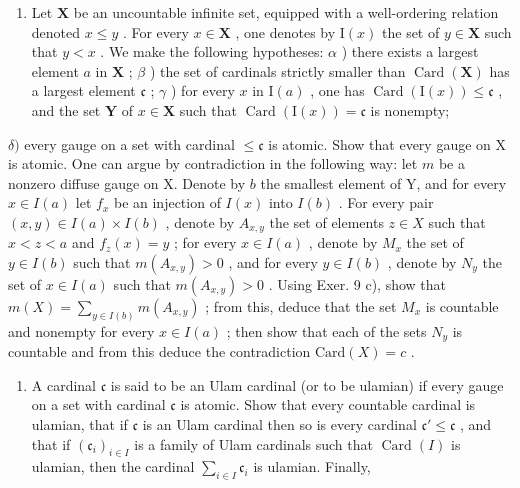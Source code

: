 \begin{enumerate}
\def\labelenumi{\arabic{enumi})}
\setcounter{enumi}{9}
\tightlist
\item
  Let \(\mathbf{X}\) be an uncountable infinite set, equipped with a well-ordering relation denoted \(x \leqslant y\) . For every \(x \in \mathbf{X}\) , one denotes by \(\mathrm{I}(x)\) the set of \(y \in \mathbf{X}\) such that \(y < x\) . We make the following hypotheses: \(\alpha\) ) there exists a largest element \(a\) in \(\mathbf{X}\) ; \(\beta\) ) the set of cardinals strictly smaller than \(\operatorname{Card}(\mathbf{X})\) has a largest element \(\mathfrak{c}\) ; \(\gamma\) ) for every \(x\) in \(\mathrm{I}(a)\) , one has \(\operatorname{Card}(\mathrm{I}(x)) \leqslant \mathfrak{c}\) , and the set \(\mathbf{Y}\) of \(x \in \mathbf{X}\) such that \(\operatorname{Card}(\mathrm{I}(x)) = \mathfrak{c}\) is nonempty;
\end{enumerate}

\(\delta)\) every gauge on a set with cardinal \(\leqslant \mathfrak{c}\) is atomic. Show that every gauge on X is atomic. One can argue by contradiction in the following way: let \(m\) be a nonzero diffuse gauge on X. Denote by \(b\) the smallest element of Y, and for every \(x \in I(a)\) let \(f_x\) be an injection of \(I(x)\) into \(I(b)\) . For every pair \((x,y) \in I(a) \times I(b)\) , denote by \(A_{x,y}\) the set of elements \(z \in X\) such that \(x < z < a\) and \(f_z(x) = y\) ; for every \(x \in I(a)\) , denote by \(M_x\) the set of \(y \in I(b)\) such that \(m(A_{x,y}) > 0\) , and for every \(y \in I(b)\) , denote by \(N_y\) the set of \(x \in I(a)\) such that \(m(A_{x,y}) > 0\) . Using Exer. 9 c), show that \(m(X) = \sum_{y \in I(b)} m(A_{x,y})\) ; from this, deduce that the set \(M_x\) is countable and nonempty for every \(x \in I(a)\) ; then show that each of the sets \(N_y\) is countable and from this deduce the contradiction \(\text{Card}(X) = c\) .

\begin{enumerate}
\def\labelenumi{\arabic{enumi})}
\setcounter{enumi}{10}
\tightlist
\item
  A cardinal \(\mathfrak{c}\) is said to be an Ulam cardinal (or to be ulamian) if every gauge on a set with cardinal \(\mathfrak{c}\) is atomic. Show that every countable cardinal is ulamian, that if \(\mathfrak{c}\) is an Ulam cardinal then so is every cardinal \(\mathfrak{c}' \leqslant \mathfrak{c}\) , and that if \((\mathfrak{c}_i)_{i \in I}\) is a family of Ulam cardinals such that \(\operatorname{Card}(I)\) is ulamian, then the cardinal \(\sum_{i \in I} \mathfrak{c}_i\) is ulamian. Finally,
\end{enumerate}

